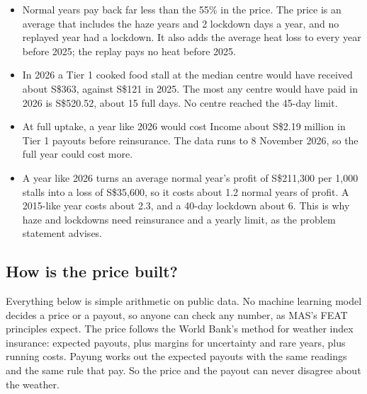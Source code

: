 \documentclass[11pt,a4paper]{article}
\newcommand{\sgd}{\textup{S\$}}
\begin{document}
\begin{itemize}[leftmargin=1.2em]
  \item Normal years pay back far less than the 55\% in the price. The price is an average that includes the haze years and 2 lockdown days a year, and no replayed year had a lockdown. It also adds the average heat loss to every year before 2025; the replay pays no heat before 2025.
  \item In 2026 a Tier 1 cooked food stall at the median centre would have received about \sgd 363, against \sgd 121 in 2025. The most any centre would have paid in 2026 is \sgd 520.52, about 15 full days. No centre reached the 45-day limit.
  \item At full uptake, a year like 2026 would cost Income about \sgd 2.19 million in Tier 1 payouts before reinsurance. The data runs to 8 November 2026, so the full year could cost more.
  \item A year like 2026 turns an average normal year's profit of \sgd 211,300 per 1,000 stalls into a loss of \sgd 35,600, so it costs about 1.2 normal years of profit. A 2015-like year costs about 2.3, and a 40-day lockdown about 6. This is why haze and lockdowns need reinsurance and a yearly limit, as the problem statement advises.\cite{ps}
\end{itemize}

\subsection{How is the price built?}\label{sec:numbers}

Everything below is simple arithmetic on public data. No machine learning model decides a price or a payout, so anyone can check any number, as MAS's FEAT principles expect. The price follows the World Bank's method for weather index insurance: expected payouts, plus margins for uncertainty and rare years, plus running costs.\cite{worldbank} Payung works out the expected payouts with the same readings and the same rule that pay. So the price and the payout can never disagree about the weather.
\end{document}
